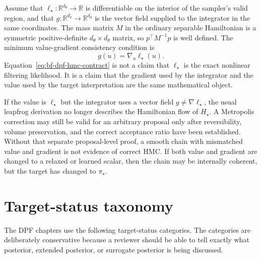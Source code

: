 Assume that $\ell_\star:\mathbb{R}^{d_\theta}\to\mathbb{R}$ is differentiable
on the interior of the sampler's valid region, and that
$g:\mathbb{R}^{d_\theta}\to\mathbb{R}^{d_\theta}$ is the vector field supplied
to the integrator in the same coordinates.  The mass matrix $M$ in the ordinary
separable Hamiltonian is a symmetric positive-definite
$d_\theta\times d_\theta$ matrix, so $p^\top M^{-1}p$ is well defined.  The
minimum value-gradient consistency condition is
\begin{equation}
\label{eq:bf-dpf-hmc-contract}
  g(u) = \nabla_u \ell_\star(u).
\end{equation}
Equation~\eqref{eq:bf-dpf-hmc-contract} is not a claim that
$\ell_\star$ is the exact nonlinear filtering likelihood.  It is a claim that
the gradient used by the integrator and the value used by the target
interpretation are the same mathematical object.

If the value is $\ell_\star$ but the integrator uses a vector field
$g\ne\nabla\ell_\star$, the usual leapfrog derivation no longer describes the
Hamiltonian flow of $H_\star$.  A Metropolis correction may still be valid for
an arbitrary proposal only after reversibility, volume preservation, and the
correct acceptance ratio have been established.  Without that separate
proposal-level proof, a smooth chain with mismatched value and gradient is not
evidence of correct HMC.  If both value and gradient are changed to a relaxed
or learned scalar, then the chain may be internally coherent, but the target has
changed to $\pi_\star$.

\section{Target-status taxonomy}
\label{sec:bf-dpf-hmc-taxonomy}

The DPF chapters use the following target-status categories.  The categories
are deliberately conservative because a reviewer should be able to tell exactly
what posterior, extended posterior, or surrogate posterior is being discussed.

